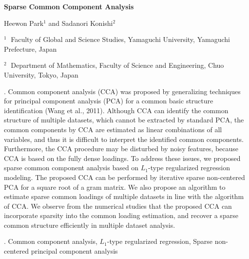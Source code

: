 \documentclass[12pt]{article}
\begin{document}
\begin{flushleft}


{\LARGE\bf Sparse Common Component Analysis}


\vspace{1.0cm}

Heewon Park$^1$ and Sadanori Konishi$^2$

\begin{description}

\item $^1 \;$ Faculty of Global and Science Studies, Yamaguchi University, Yamaguchi Prefecture, Japan
\item $^2 \;$ Department of Mathematics, Faculty of Science and Engineering, Chuo University, Tokyo, Japan

\end{description}

\end{flushleft}


\vspace{0.75cm}

. 
Common component analysis (CCA) was proposed by generalizing techniques for principal component analysis (PCA) for a common basic structure identification (Wang et al., 2011).
Although CCA can identify the common structure of multiple datasets, which cannot be extracted by standard PCA, the common components by CCA are estimated as linear combinations of all variables, and thus it is difficult to interpret the identified common components. 
Furthermore, the CCA procedure may be disturbed by noisy features, because CCA is based on the fully dense loadings.
To address these issues, we proposed sparse common component analysis based on $L_{1}$-type regularized regression modeling.
The proposed CCA can be performed by iterative sparse non-centered PCA for a square root of a gram matrix.
We also propose an algorithm to estimate sparse common loadings of multiple datasets in line with the algorithm of CCA.
We observe from the numerical studies that the proposed CCA can incorporate sparsity into the common loading estimation, and recover a sparse common structure efficiently in multiple dataset analysis.
\vskip 2mm

.
Common component analysis, $L_{1}$-type regularized regression, Sparse non-centered principal component analysis
\end{document}
